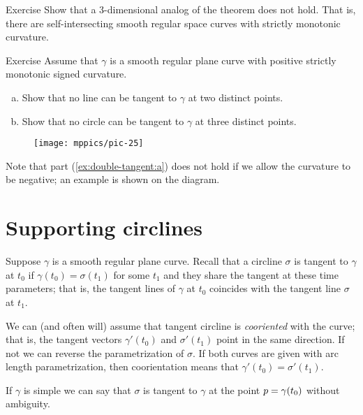 \begin{thm}{Exercise}\label{ex:3D-spiral}
Show that a 3-dimensional analog of the theorem does not hold.
That is, there are self-intersecting smooth regular space curves with strictly monotonic curvature.
\end{thm}

\begin{thm}{Exercise}\label{ex:double-tangent}
Assume that $\gamma$ is a smooth regular plane curve with positive strictly monotonic signed curvature.
\begin{enumerate}[(a)]
\item\label{ex:double-tangent:a}Show that no line can be tangent to $\gamma$ at two distinct points.
\item Show that no circle can be tangent to $\gamma$ at three distinct points. 
\end{enumerate}
\end{thm} %

{

\begin{wrapfigure}{r}{35 mm}
\vskip-4mm
\centering
\texttt{[image: mppics/pic-25]}
\vskip0mm
\end{wrapfigure}

Note that part (\ref{ex:double-tangent:a}) does not hold if we allow the curvature to be negative; an example is shown on the diagram.

}

\section*{Supporting circlines}

Suppose $\gamma$ is a smooth regular plane curve.
Recall that a circline $\sigma$ is tangent to $\gamma$ at $t_0$ if
$\gamma(t_0)=\sigma(t_1)$ for some $t_1$ and they share the tangent at these time parameters;
that is, the tangent lines of $\gamma$ at $t_0$ coincides with the tangent line $\sigma$ at $t_1$.

We can (and often will) assume that tangent circline is \emph{cooriented} with the curve;
that is, the tangent vectors $\gamma'(t_0)$ and $\sigma'(t_1)$ point in the same direction.
If not we can reverse the parametrization of $\sigma$.
If both curves are given with arc length parametrization, then coorientation  means that $\gamma'(t_0)=\sigma'(t_1)$.

If $\gamma$ is simple we can say that $\sigma$ is tangent to $\gamma$ at the point $p\z=\gamma(t_0)$ without ambiguity.


